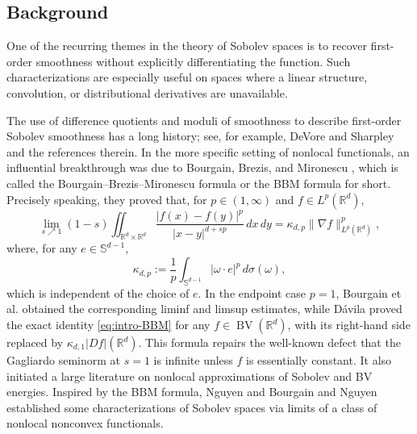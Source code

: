 \documentclass[11pt]{amsart}
\theoremstyle{definition}
\theoremstyle{remark}
\numberwithin{equation}{section}
\begin{document}
\subsection{Background}

One of the recurring themes in the theory of Sobolev spaces is to recover
first-order smoothness without explicitly differentiating the function.  Such
characterizations are especially useful on spaces where a linear structure,
convolution, or distributional derivatives are unavailable.

The use of difference quotients and moduli of smoothness
to describe first-order Sobolev smoothness has a long history; see, for
example, DeVore and Sharpley
\cite{DS84} and the references therein.  In the more specific setting of
nonlocal functionals, an influential breakthrough was due to Bourgain,
Brezis, and Mironescu \cite{BBM}, which is called the
Bourgain--Brezis--Mironescu formula or the BBM formula for short. Precisely speaking,
they proved that, for
$p\in(1,\infty)$ and
$f\in L^p(\mathbb R^d)$,
\begin{equation}\label{eq:intro-BBM}
 \lim_{s\nearrow 1}(1-s)
 \iint_{\mathbb R^d\times\mathbb R^d}
 \frac{|f(x)-f(y)|^p}{|x-y|^{d+sp}}\,dx\,dy
 = \kappa_{d,p}\|\nabla f\|_{L^p(\mathbb R^d)}^p,
\end{equation}
where, for any $e\in\mathbb S^{d-1}$,
\begin{equation*}
 \kappa_{d,p}:=\frac{1}{p}\int_{\mathbb S^{d-1}}
 |\omega\cdot e|^p\,d\sigma(\omega),
\end{equation*}
which is independent of the choice of $e$.  In the endpoint case $p=1$,
Bourgain et al. obtained the corresponding liminf and limsup
estimates, while D\'avila \cite{Davila02} proved the exact identity
\eqref{eq:intro-BBM} for any $f\in \operatorname{BV}(\mathbb R^d)$, with its
right-hand side replaced by $\kappa_{d,1}|Df|(\mathbb R^d)$.
This formula repairs the well-known defect that the Gagliardo seminorm at
$s=1$ is infinite unless $f$ is essentially constant.  It also initiated a
large literature on nonlocal approximations of Sobolev and BV energies.
Inspired by the BBM formula, Nguyen \cite{N:06} and Bourgain and Nguyen
\cite{BN06} established some characterizations of Sobolev spaces via limits of a
class of nonlocal nonconvex functionals.
\end{document}
